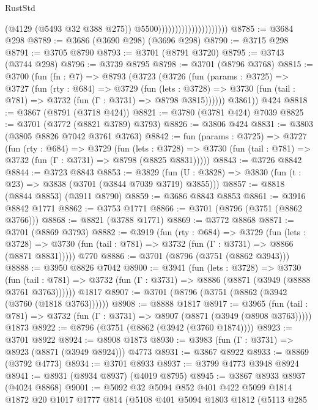 \begin{lexlean}{RustStd}
\begin{coremodule}
{\begin{coremodule}
{{{{{{{{{{{{{{                                              (@4129 (@5493 @32 @388 @275))
                                              @5500)))))))))))))))))))))
@8785 := @3684 @298
@8789 := @3686 (@3690 @298) (@3696 @298)
@8790 := @3715 @298
@8791 := @3705 @8790
@8793 := @3701 (@8791 @3720)
@8795 := @3743 (@3744 @298)
@8796 := @3739 @8795
@8798 := @3701 (@8796 @3768)
@8815 := @3700
    (fun (fn : @7) =>
    @8793
      (@3723
        (@3726
          (fun (params : @3725) =>
          @3727
            (fun (rty : @684) =>
            @3729
              (fun (lets : @3728) =>
              @3730 (fun (tail : @781) => @3732 (fun (Γ : @3731) => @8798 @3815))))))
        @3861))
    @424
@8818 := @3867 (@8791 (@3718 @424))
@8821 := @3780 (@3781 @424) @7039
@8825 := @3701 (@3772 (@8821 @3789) @3793)
@8826 := @3806 @424
@8831 := @3803 (@3805 @8826 @7042 @3761 @3763)
@8842 := fun (params : @3725) =>
  @3727
    (fun (rty : @684) =>
    @3729
      (fun (lets : @3728) =>
      @3730 (fun (tail : @781) => @3732 (fun (Γ : @3731) => @8798 (@8825 @8831)))))
@8843 := @3726 @8842
@8844 := @3723 @8843
@8853 := @3829 (fun (U : @3828) => @3830 (fun (t : @23) => @3838 (@3701 (@3844 @7039 @3719) @3855)))
@8857 := @8818 (@8844 @8853) (@3911 @8790)
@8859 := @3686 @8843 @8853
@8861 := @3916 @8842 @1771
@8862 := @3753 @1771
@8866 := @3701 (@8796 (@3751 (@8862 @3766)))
@8868 := @8821 (@3788 @1771)
@8869 := @3772 @8868
@8871 := @3701 (@8869 @3793)
@8882 := @3919
    (fun (rty : @684) =>
    @3729
      (fun (lets : @3728) =>
      @3730 (fun (tail : @781) => @3732 (fun (Γ : @3731) => @8866 (@8871 @8831)))))
    @770
@8886 := @3701 (@8796 (@3751 (@8862 @3943)))
@8888 := @3950 @8826 @7042
@8900 := @3941
    (fun (lets : @3728) =>
    @3730
      (fun (tail : @781) => @3732 (fun (Γ : @3731) => @8886 (@8871 (@3949 (@8888 @3761 @3763))))))
    @1817
@8907 := @3701 (@8796 (@3751 (@8862 (@3942 (@3760 (@1818 @3763))))))
@8908 := @8888 @1817
@8917 := @3965
    (fun (tail : @781) => @3732 (fun (Γ : @3731) => @8907 (@8871 (@3949 (@8908 @3763)))))
    @1873
@8922 := @8796 (@3751 (@8862 (@3942 (@3760 @1874))))
@8923 := @3701 @8922
@8924 := @8908 @1873
@8930 := @3983 (fun (Γ : @3731) => @8923 (@8871 (@3949 @8924))) @4773
@8931 := @3867 @8922
@8933 := @8869 (@3792 @4773)
@8934 := @3701 @8933
@8937 := @3799 @4773 @3948 @8924
@8941 := @8931 (@8934 @8937) (@4019 @8795)
@8945 := @3867 @8933 @8937 (@4024 @8868)
@9001 := @5092
    @32
    @5094
    @852
    @401
    @422
    @5099
    @1814
    @1872
    @20
    @1017
    @1777
    @814
    (@5108
      @401
      @5094
      @1803
      @1812
      (@5113
        @285
}}}}}}}}}}}}}}
\end{coremodule}}
\end{coremodule}
\end{lexlean}
